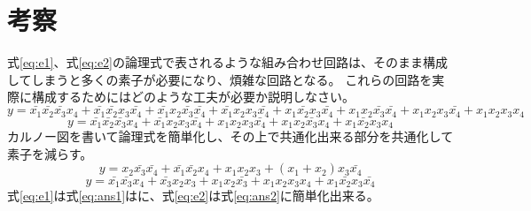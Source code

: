 \documentclass[dvipdfmx,a4paper]{jsarticle}
\begin{document}
	\section{考察}
		式\ref{eq:e1}、式\ref{eq:e2}の論理式で表されるような組み合わせ回路は、そのまま構成してしまうと多くの素子が必要になり、煩雑な回路となる。
		これらの回路を実際に構成するためにはどのような工夫が必要か説明しなさい。
		\begin{equation}
			\label{eq:e1}
			y = \bar{x_1} \bar{x_2} \bar{x_3} x_4 + \bar{x_1} \bar{x_2} x_3 \bar{x_4} + \bar{x_1} x_2 \bar{x_3} \bar{x_4} + \bar{x_1} x_2 x_3 \bar{x_4} +
				x_1 \bar{x_2} x_3 \bar{x_4} + x_1 x_2 \bar{x_3} \bar{x_4} + x_1 x_2 x_3 \bar{x_4} + x_1 x_2 x_3 x_4
		\end{equation}
		\begin{equation}
			\label{eq:e2}
			y = \bar{x_1} \bar{x_2} \bar{x_3} x_4 + \bar{x_1} x_2 x_3 \bar{x_4} + x_1 x_2 x_3 \bar{x_4} + x_1 x_2 \bar{x_3} x_4 + x_1 \bar{x_2} x_3 x_4
		\end{equation}
		カルノー図を書いて論理式を簡単化し、その上で共通化出来る部分を共通化して素子を減らす。
		\begin{equation}
			\label{eq:ans1}
			y = x_2 \bar{x_3} \bar{x_4} + \bar{x_1} \bar{x_2} x_4 + x_1 x_2 x_3 + (x_1 + x_2) x_3 \bar{x_4}
		\end{equation}
		\begin{equation}
			\label{eq:ans2}
			y = \bar{x_1} \bar{x_3} x_4 + \bar{x_3} x_2 x_3 + x_1 x_2 \bar{x_3} + x_1 x_2 x_3 x_4 + x_1 \bar{x_2} x_3 \bar{x_4}
		\end{equation}
		式\ref{eq:e1}は式\ref{eq:ans1}はに、式\ref{eq:e2}は式\ref{eq:ans2}に簡単化出来る。
\end{document}

